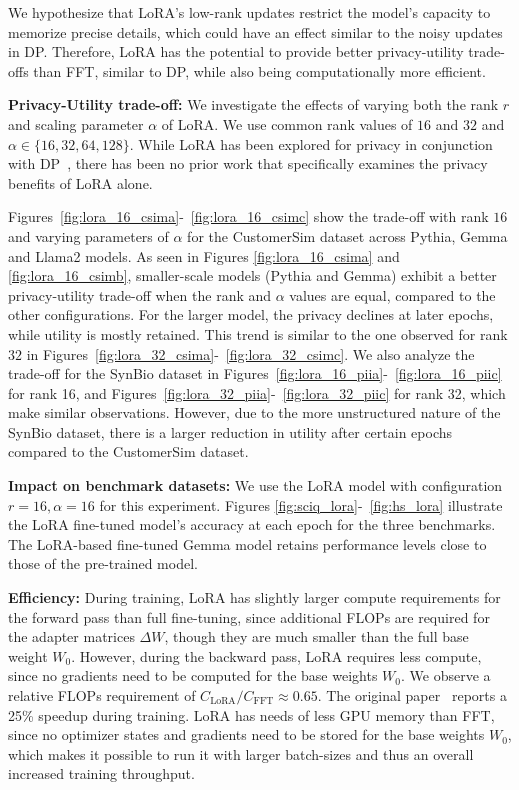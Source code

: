 We hypothesize that LoRA's low-rank updates restrict the model's capacity to memorize precise details, which could have an effect similar to the noisy updates in DP.
Therefore, LoRA has the potential to provide better privacy-utility trade-offs than FFT, similar to DP, while also being computationally more efficient.


\noindent
\textbf{Privacy-Utility trade-off:}
We investigate the effects of varying both the rank $r$ and scaling parameter $\alpha$ of LoRA.
We use common rank values of $16$ and $32$ and $\alpha \in \{16,32,64,128\}$.
While LoRA has been explored for privacy in conjunction with DP~\cite{yu2022differentiallyprivatefinetuninglanguage}, there has been no prior work that specifically examines the privacy benefits of LoRA alone. 

Figures~\ref{fig:lora_16_csima}-~\ref{fig:lora_16_csimc} show the trade-off with rank $16$ and varying parameters of $\alpha$ for the CustomerSim dataset across Pythia, Gemma and Llama2 models. As seen in Figures \ref{fig:lora_16_csima} and \ref{fig:lora_16_csimb}, smaller-scale models (Pythia and Gemma) exhibit a better privacy-utility trade-off when the rank and $\alpha$ values are equal, compared to the other configurations. For the larger model, the privacy declines at later epochs, while utility is mostly retained.
This trend is similar to the one observed for rank $32$ in Figures~\ref{fig:lora_32_csima}-~\ref{fig:lora_32_csimc}. 
We also analyze the trade-off for the SynBio dataset in Figures~\ref{fig:lora_16_piia}-~\ref{fig:lora_16_piic} for rank 16, and Figures~\ref{fig:lora_32_piia}-~\ref{fig:lora_32_piic} for rank 32, which make similar observations. 
However, due to the more unstructured nature of the SynBio dataset, there is a larger reduction in utility after certain epochs compared to the CustomerSim dataset.

\noindent
\textbf{Impact on benchmark datasets:} We use the LoRA model with configuration $r=16, \alpha=16$ for this experiment. Figures \ref{fig:sciq_lora}-~\ref{fig:hs_lora} illustrate the LoRA fine-tuned model's accuracy at each epoch for the three benchmarks. 
The LoRA-based fine-tuned Gemma model retains performance levels close to those of the pre-trained model.

\noindent
\textbf{Efficiency:}
During training, LoRA has slightly larger compute requirements for the forward pass than full fine-tuning, since additional FLOPs are required for the adapter matrices $\Delta W$, though they are much smaller than the full base weight $W_0$.
However, during the backward pass, LoRA requires less compute, since no gradients need to be computed for the base weights $W_0$.
We observe a relative FLOPs requirement of $C_{\text{LoRA}} / C_{\text{FFT}} \approx 0.65$.
The original paper~\cite{hu2022lora} reports a 25\% speedup during training.
LoRA has needs of less GPU memory than FFT, since no optimizer states and gradients need to be stored for the base weights $W_0$, which makes it possible to run it with larger batch-sizes and thus an overall increased training throughput.

